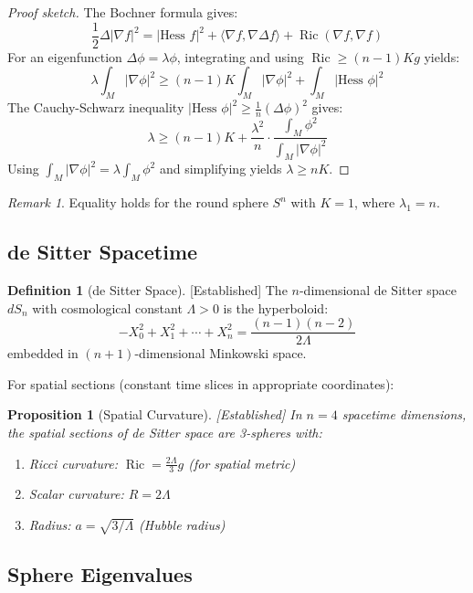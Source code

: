 \documentclass[11pt,a4paper]{article}
\theoremstyle{plain}
\newtheorem{proposition}[theorem]{Proposition}
\theoremstyle{definition}
\newtheorem{definition}[theorem]{Definition}
\theoremstyle{remark}
\newtheorem{remark}[theorem]{Remark}
\newcommand{\Laplacian}{\Delta}
\newcommand{\ip}[2]{\langle #1, #2 \rangle}
\newcommand{\Ric}{\operatorname{Ric}}
\newcommand{\established}{\textcolor{green!50!black}{[Established]}}
\begin{document}
\begin{proof}[Proof sketch]
The Bochner formula gives:
\[
\frac{1}{2} \Laplacian |\nabla f|^2 = |\text{Hess } f|^2 + \ip{\nabla f}{\nabla \Laplacian f} + \Ric(\nabla f, \nabla f)
\]
For an eigenfunction $\Laplacian \phi = \lambda \phi$, integrating and using $\Ric \geq (n-1)K g$ yields:
\[
\lambda \int_M |\nabla \phi|^2 \geq (n-1)K \int_M |\nabla \phi|^2 + \int_M |\text{Hess } \phi|^2
\]
The Cauchy-Schwarz inequality $|\text{Hess } \phi|^2 \geq \frac{1}{n}(\Laplacian \phi)^2$ gives:
\[
\lambda \geq (n-1)K + \frac{\lambda^2}{n} \cdot \frac{\int_M \phi^2}{\int_M |\nabla \phi|^2}
\]
Using $\int_M |\nabla \phi|^2 = \lambda \int_M \phi^2$ and simplifying yields $\lambda \geq nK$.
\end{proof}

\begin{remark}
Equality holds for the round sphere $S^n$ with $K = 1$, where $\lambda_1 = n$.
\end{remark}

\subsection{de Sitter Spacetime}

\begin{definition}[de Sitter Space] \established
The $n$-dimensional de Sitter space $dS_n$ with cosmological constant $\Lambda > 0$ is the hyperboloid:
\[
-X_0^2 + X_1^2 + \cdots + X_n^2 = \frac{(n-1)(n-2)}{2\Lambda}
\]
embedded in $(n+1)$-dimensional Minkowski space.
\end{definition}

For spatial sections (constant time slices in appropriate coordinates):

\begin{proposition}[Spatial Curvature] \established
\label{prop:desitter_curvature}
In $n=4$ spacetime dimensions, the spatial sections of de Sitter space are 3-spheres with:
\begin{enumerate}[label=(\roman*),noitemsep]
    \item Ricci curvature: $\Ric = \frac{2\Lambda}{3} g$ (for spatial metric)
    \item Scalar curvature: $R = 2\Lambda$
    \item Radius: $a = \sqrt{3/\Lambda}$ (Hubble radius)
\end{enumerate}
\end{proposition}

\subsection{Sphere Eigenvalues}
\end{document}
